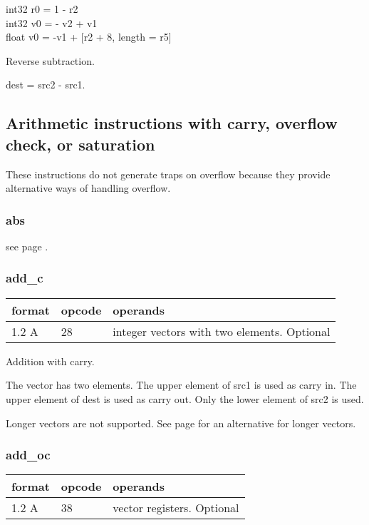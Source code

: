 \documentclass[forwardcom.tex]{subfiles}
\begin{document}
int32 r0 = 1 - r2 \\
int32 v0 = - v2 + v1 \\
float v0 = -v1 + [r2 + 8, length = r5]
\vspace{2mm}

Reverse subtraction.
\vspace{2mm}

dest = src2 - src1.
\vspace{2mm}


\subsection{Arithmetic instructions with carry, overflow check, or saturation}
These instructions do not generate traps on overflow because they provide alternative ways of handling overflow.
\vspace{2mm}

\subsubsection{abs}
see page \pageref{table:absInstruction}.
\vspace{2mm}

\subsubsection{add\_c}
\label{table:addCInstruction}
\begin{tabular}{|p{12mm}|p{12mm}|p{110mm}|}
\hline
\bfseries format & \bfseries opcode & \bfseries operands \\ \hline
1.2 A & 28 & integer vectors with two elements. Optional \\ \hline
\end{tabular}
\vspace{2mm}

Addition with carry.
\vspace{2mm}

The vector has two elements. The upper element of src1 is used as carry in. The upper element of dest is used as carry out. Only the lower element of src2 is used.
\vspace{2mm}

Longer vectors are not supported. See page 
\pageref{highPrecisionArithmetic} for an alternative for longer vectors.

\subsubsection{add\_oc}
\label{table:addOcInstruction}
\begin{tabular}{|p{12mm}|p{12mm}|p{110mm}|}
\hline
\bfseries format & \bfseries opcode & \bfseries operands \\ \hline
1.2 A & 38 & vector registers. Optional \\ \hline
\end{tabular}
\vspace{2mm}
\end{document}
